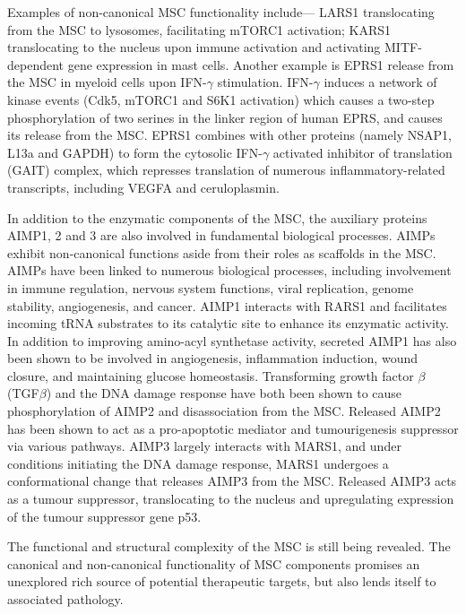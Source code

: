Examples of non-canonical MSC functionality include--- LARS1 translocating from the MSC to lysosomes, facilitating mTORC1 activation\cite{han2012leucyl}; KARS1 translocating to the nucleus upon immune activation and activating MITF-dependent gene expression in mast cells\cite{yannay2009lysrs}.
Another example is EPRS1 release from the MSC in myeloid cells upon IFN-$\gamma$ stimulation\cite{arif2009two}.
IFN-$\gamma$ induces a network of kinase events (Cdk5, mTORC1 and S6K1 activation) which causes a two-step phosphorylation of two serines in the linker region of human EPRS, and causes its release from the MSC.
EPRS1 combines with other proteins (namely NSAP1, L13a and GAPDH) to form the cytosolic IFN-$\gamma$ activated inhibitor of translation (GAIT) complex, which represses translation of numerous inflammatory-related transcripts, including VEGFA and ceruloplasmin\cite{arif2018gait}.


In addition to the enzymatic components of the MSC, the auxiliary proteins AIMP1, 2 and 3 are also involved in fundamental biological processes.
AIMPs exhibit non-canonical functions aside from their roles as scaffolds in the MSC.
AIMPs have been linked to numerous biological processes, including involvement in immune regulation, nervous system functions, viral replication, genome stability, angiogenesis, and cancer.
AIMP1 interacts with RARS1 and facilitates incoming tRNA substrates to its catalytic site to enhance its enzymatic activity\cite{park1999precursor}.
In addition to improving amino-acyl synthetase activity, secreted AIMP1 has also been shown to be involved in angiogenesis, inflammation induction, wound closure, and maintaining glucose homeostasis\cite{park2006hormonal}.
Transforming growth factor $\beta$ (TGF$\beta$) and the DNA damage response have both been shown to cause phosphorylation of AIMP2 and disassociation from the MSC.
Released AIMP2 has been shown to act as a pro-apoptotic mediator and tumourigenesis suppressor via various pathways\cite{zhou2020roles}.
AIMP3 largely interacts with MARS1, and under conditions initiating the DNA damage response, MARS1 undergoes a conformational change that releases AIMP3 from the MSC\cite{kwon2011dual}.
Released AIMP3 acts as a tumour suppressor, translocating to the nucleus and upregulating expression of the tumour suppressor gene p53.

The functional and structural complexity of the MSC is still being revealed.
The canonical and non-canonical functionality of MSC components promises an unexplored rich source of potential therapeutic targets, but also lends itself to associated pathology.

